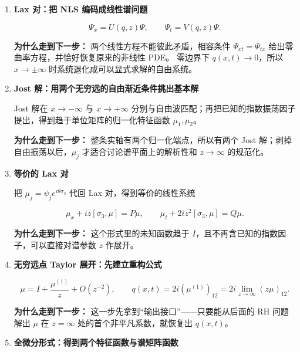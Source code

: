 \documentclass[
    lang=cn,
    scheme=chinese,
    mode=simple,
    device=normal,
    color=blue,
    math=cm,
    thmcnt=section,
    12pt
]{elegantbook}
\begin{document}
\begin{enumerate}[(1)]

    \item \textbf{Lax 对：把 NLS 编码成线性谱问题}

          \[
              \Psi_x=U(q,z)\Psi,
              \qquad
              \Psi_t=V(q,z)\Psi.
          \]

          \textbf{为什么走到下一步：}
          两个线性方程不能彼此矛盾，相容条件 $\Psi_{xt}=\Psi_{tx}$ 给出零曲率方程，并恰好恢复原来的非线性 PDE。
          零边界下 $q(x,t)\to0$，所以 $x\to\pm\infty$ 时系统退化成可以显式求解的自由系统。

    \item \textbf{Jost 解：用两个无穷远的自由渐近条件挑出基本解}

          Jost 解在 $x\to-\infty$ 与 $x\to+\infty$ 分别与自由波匹配；再把已知的指数振荡因子提出，得到趋于单位矩阵的归一化特征函数 $\mu_1,\mu_2$。

          \textbf{为什么走到下一步：}
          整条实轴有两个归一化端点，所以有两个 Jost 解；剥掉自由振荡以后，$\mu_j$ 才适合讨论谱平面上的解析性和 $z\to\infty$ 的规范化。

    \item \textbf{等价的 Lax 对}

          把 $\mu_j=\psi_j e^{i\theta\sigma_3}$ 代回 Lax 对，得到等价的线性系统

          \[
              \mu_x+iz[\sigma_3,\mu]=P\mu,
              \qquad
              \mu_t+2iz^2[\sigma_3,\mu]=Q\mu.
          \]

          \textbf{为什么走到下一步：}
          这个形式里的未知函数趋于 $I$，且不再含已知的指数因子，可以直接对谱参数 $z$ 作展开。

    \item \textbf{无穷远点 Taylor 展开：先建立重构公式}

          \[
              \mu
              =I+\dfrac{\mu^{(1)}}{z}+O(z^{-2}),
              \qquad
              q(x,t)
              =2i(\mu^{(1)})_{12}
              =2i\lim\limits_{z\to\infty}(z\mu)_{12}.
          \]

          \textbf{为什么走到下一步：}
          这一步先拿到``输出接口''——只要能从后面的 RH 问题解出 $\mu$ 在 $z=\infty$ 处的首个非平凡系数，就恢复出 $q(x,t)$。

    \item \textbf{全微分形式：得到两个特征函数与谱矩阵函数}


\end{enumerate}
\end{document}
